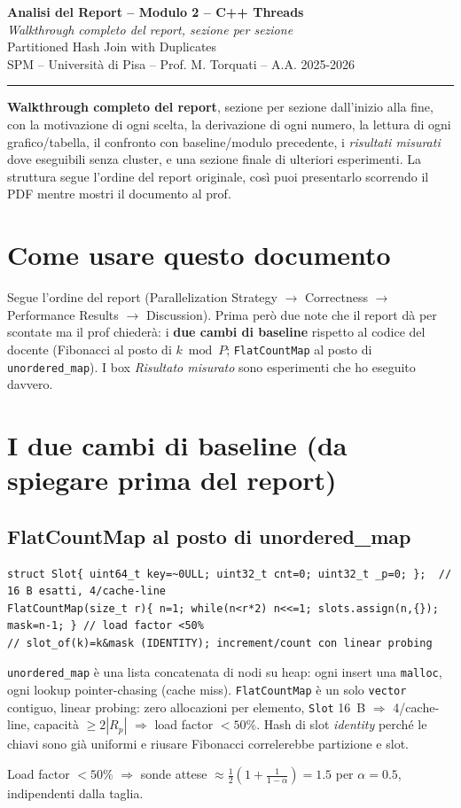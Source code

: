 \documentclass[11pt,a4paper]{article}
\newcommand{\doctitle}[2]{%
  \begin{titlepage}\centering\vspace*{2cm}
  {\LARGE\bfseries Analisi del Report -- #1\\[0.6em]}
  {\large\itshape #2}\\[1.5em]
  {\large Partitioned Hash Join with Duplicates}\\[0.4em]
  {\large SPM -- Università di Pisa -- Prof. M. Torquati -- A.A. 2025-2026}\\[2em]
  \hrule\vspace{1em}
  \begin{flushleft}\small \textbf{Walkthrough completo del report}, sezione per sezione dall'inizio alla fine, con la motivazione di ogni scelta, la derivazione di ogni numero, la lettura di ogni grafico/tabella, il confronto con baseline/modulo precedente, i \emph{risultati misurati} dove eseguibili senza cluster, e una sezione finale di ulteriori esperimenti. La struttura segue l'ordine del report originale, così puoi presentarlo scorrendo il PDF mentre mostri il documento al prof.\end{flushleft}
  \end{titlepage}
  \tableofcontents\newpage}
\begin{document}
\doctitle{Modulo 2 -- C++ Threads}{Walkthrough completo del report, sezione per sezione}

\section*{Come usare questo documento}
Segue l'ordine del report (Parallelization Strategy $\to$ Correctness $\to$ Performance Results $\to$ Discussion). Prima però due note che il report dà per scontate ma il prof chiederà: i \textbf{due cambi di baseline} rispetto al codice del docente (Fibonacci al posto di $k\bmod P$; \texttt{FlatCountMap} al posto di \texttt{unordered\_map}). I box \emph{Risultato misurato} sono esperimenti che ho eseguito davvero.

\section{I due cambi di baseline (da spiegare prima del report)}

\subsection{FlatCountMap al posto di unordered\_map}

\begin{lstlisting}[style=cpp]
struct Slot{ uint64_t key=~0ULL; uint32_t cnt=0; uint32_t _p=0; };  // 16 B esatti, 4/cache-line
FlatCountMap(size_t r){ n=1; while(n<r*2) n<<=1; slots.assign(n,{}); mask=n-1; } // load factor <50%
// slot_of(k)=k&mask (IDENTITY); increment/count con linear probing
\end{lstlisting}

\begin{motiv}
\texttt{unordered\_map} è una lista concatenata di nodi su heap: ogni insert una \texttt{malloc}, ogni lookup pointer-chasing (cache miss). \texttt{FlatCountMap} è un solo \texttt{vector} contiguo, linear probing: zero allocazioni per elemento, \texttt{Slot} 16~B $\Rightarrow$ 4/cache-line, capacità $\ge2|R_p|$ $\Rightarrow$ load factor $<50\%$. Hash di slot \emph{identity} perché le chiavi sono già uniformi e riusare Fibonacci correlerebbe partizione e slot.
\end{motiv}

\begin{deriv}
Load factor $<50\%$ $\Rightarrow$ sonde attese $\approx\frac12(1+\frac{1}{1-\alpha})=1.5$ per $\alpha=0.5$, indipendenti dalla taglia.
\end{deriv}
\end{document}
